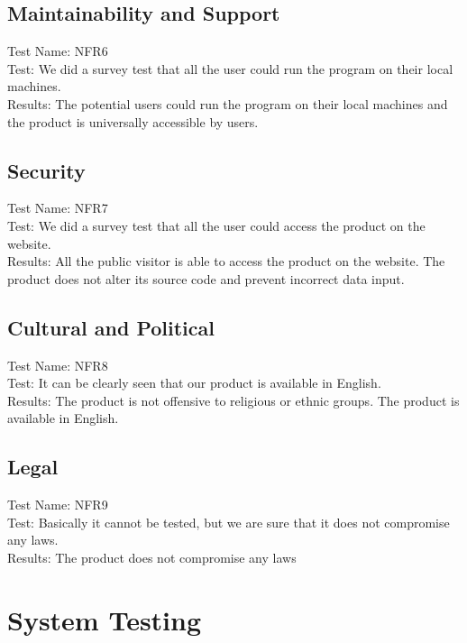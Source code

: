 \documentclass[12pt, titlepage]{article}
\begin{document}
	\subsection{Maintainability and Support}
	Test Name: NFR6\\
	
	Test: We did a survey test that all the user could run the program on their local machines.\\
	
    Results: The potential users could run the program on their local machines and the product is universally accessible by users.
	
	\subsection{Security}
	Test Name: NFR7\\
	
	Test: We did a survey test that all the user could access the product on the website.\\
	
    Results: All the public visitor is able to access the product on the website. The product does not alter its source code and prevent incorrect data input.
	\subsection{Cultural and Political}
	Test Name: NFR8\\
	
	Test: It can be clearly seen that our product is available in English.\\
	
    Results: The product is not offensive to religious or ethnic groups. The product is available in English.
	\subsection{Legal}
    Test Name: NFR9\\
    
    Test: Basically it cannot be tested, but we are sure that it does not compromise any laws.\\
    
    Results: The product does not compromise any laws
	


\section{System Testing}	
\end{document}
